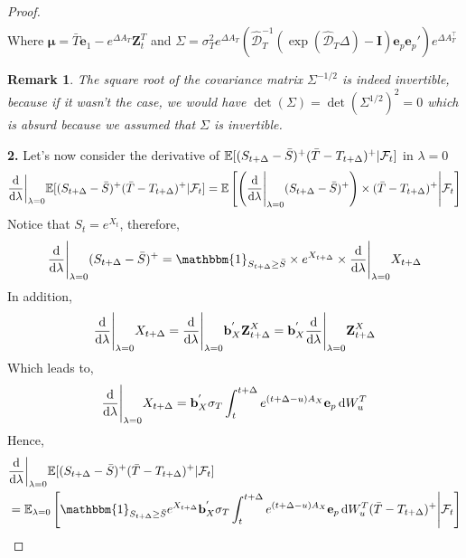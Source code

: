 \documentclass[10pt,a4paper,reqno]{amsart}
\newtheorem{remark}[theorem]{Remark}
\theoremstyle{example}
\newcommand*\D{\mathop{}\!\textnormal{d}}
\newcommand{\opI}{\mathbf{I}}
\begin{document}
\begin{proof}
\begin{align}
\end{align}
Where $\boldsymbol\mu=\bar{T}\textbf{e}_1-e^{\Delta A_T}\textbf{Z}_t^T$ and $\Sigma = \sigma_T^2e^{\Delta A_T}\left(\hat{\mathcal{D}}_{T}^{-1}\left(\exp(\hat{\mathcal{D}}_{T}\Delta)-\opI\right)\textbf{e}_p \textbf{e}_p'
    \right)e^{\Delta A_T^\intercal}$ 
\begin{remark}
    The square root of the covariance matrix $\Sigma^{-1/2}$ is indeed invertible, because if it wasn't the case, we would have $\det(\Sigma)=\det(\Sigma^{1/2})^2=0$ which is absurd because we assumed that $\Sigma$ is invertible.
\end{remark}
\noindent
\textbf{2.} Let's now consider the derivative of $\mathbb{E}[(S_{t+\Delta}-\Bar{S})^+(\Bar{T}-T_{t+\Delta})^+ | \mathcal{F}_t]$ in $\lambda=0$
\begin{align}
    \frac{\D }{\D \lambda}\bigg|_{\lambda=0} \mathbb{E}[(S_{t+\Delta}-\Bar{S})^+(\Bar{T}-T_{t+\Delta})^+ | \mathcal{F}_t]= \mathbb{E}\left[\left(\frac{\D }{\D \lambda}\Bigg|_{\lambda=0}(S_{t+\Delta}-\Bar{S})^+\right)\times(\Bar{T}-T_{t+\Delta})^+ \Bigg| \mathcal{F}_t\right]\nonumber 
\end{align}
Notice that $S_t=e^{X_t}$, therefore,
\begin{align}
    \frac{\D }{\D \lambda}\Bigg|_{\lambda=0}(S_{t+\Delta}-\Bar{S})^+=\mathbbm{1}_{S_{t+\Delta}\geq \Bar{S}}\times e^{X_{t+\Delta}}\times\frac{\D }{\D \lambda}\Bigg|_{\lambda=0}X_{t+\Delta}  \nonumber
\end{align}
In addition,
\begin{align}
    \frac{\D }{\D \lambda}\Bigg|_{\lambda=0}X_{t+\Delta} = \frac{\D }{\D \lambda}\Bigg|_{\lambda=0}\mathbf{b}_X^{'}\textbf{Z}_{t+\Delta}^X=\mathbf{b}_X^{'}\frac{\D }{\D \lambda}\Bigg|_{\lambda=0}\textbf{Z}_{t+\Delta}^X\nonumber
\end{align}
Which leads to,
\begin{align}
    \frac{\D }{\D \lambda}\Bigg|_{\lambda=0}X_{t+\Delta} = \mathbf{b}_X^{'} \sigma_T \int_t^{t+\Delta} e^{(t+\Delta-u)A_X}\textbf{e}_p\D W_u^T\nonumber
\end{align}
Hence,
\begin{align}
    &\frac{\D }{\D \lambda}\bigg|_{\lambda=0} \mathbb{E}[(S_{t+\Delta}-\Bar{S})^+(\Bar{T}-T_{t+\Delta})^+ | \mathcal{F}_t]\nonumber\\
    &=\mathbb{E}_{\lambda=0}\left[\mathbbm{1}_{S_{t+\Delta}\geq \Bar{S}} e^{X_{t+\Delta}}\mathbf{b}_X^{'} \sigma_T \int_t^{t+\Delta} e^{(t+\Delta-u)A_X}\textbf{e}_p\D W_u^T(\Bar{T}-T_{t+\Delta})^+ \Bigg| \mathcal{F}_t\right]\nonumber\\

\end{align}
\end{proof}
\end{document}
